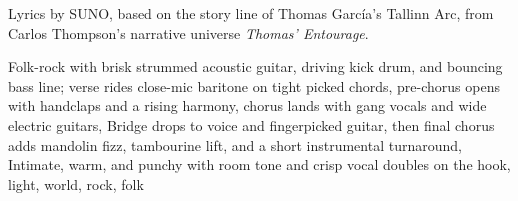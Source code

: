 
\begin{notes}
Lyrics by SUNO, based on the story line of Thomas García's Tallinn Arc, from Carlos Thompson's narrative universe \emph{Thomas’ Entourage}.
\end{notes}
\begin{style}
Folk-rock with brisk strummed acoustic guitar, driving kick drum, and bouncing bass line; verse rides close-mic baritone on tight picked chords, pre-chorus opens with handclaps and a rising harmony, chorus lands with gang vocals and wide electric guitars, Bridge drops to voice and fingerpicked guitar, then final chorus adds mandolin fizz, tambourine lift, and a short instrumental turnaround, Intimate, warm, and punchy with room tone and crisp vocal doubles on the hook, light, world, rock, folk
\end{style}
